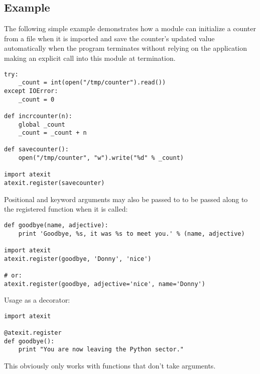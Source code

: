 \begin{seealso}
\end{seealso}


\subsection{ Example \label{atexit-example}}

The following simple example demonstrates how a module can initialize
a counter from a file when it is imported and save the counter's
updated value automatically when the program terminates without
relying on the application making an explicit call into this module at
termination.

\begin{verbatim}
try:
    _count = int(open("/tmp/counter").read())
except IOError:
    _count = 0

def incrcounter(n):
    global _count
    _count = _count + n

def savecounter():
    open("/tmp/counter", "w").write("%d" % _count)

import atexit
atexit.register(savecounter)
\end{verbatim}

Positional and keyword arguments may also be passed to
 to be passed along to the registered function
when it is called:

\begin{verbatim}
def goodbye(name, adjective):
    print 'Goodbye, %s, it was %s to meet you.' % (name, adjective)

import atexit
atexit.register(goodbye, 'Donny', 'nice')

# or:
atexit.register(goodbye, adjective='nice', name='Donny')
\end{verbatim}

Usage as a decorator:

\begin{verbatim}
import atexit

@atexit.register
def goodbye():
    print "You are now leaving the Python sector."
\end{verbatim}

This obviously only works with functions that don't take arguments.
